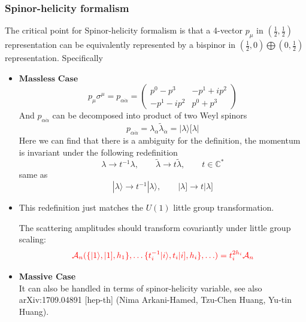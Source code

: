 \documentclass{beamer}
\newcommand{\aket}[1]{|#1\rangle}
\newcommand{\sket}[1]{|#1]}
\begin{document}
\begin{frame}
\frametitle{Spinor-helicity formalism}
    The critical point for Spinor-helicity formalism is that a 4-vector $p_\mu$ in $(\frac{1}{2},\frac{1}{2})$ representation can be equivalently represented by a bispinor in $(\frac{1}{2},0)\bigoplus (0,\frac{1}{2})$ representation.
    Specifically
    \begin{itemize}
        \item $\bm{\text{Massless Case}}$\\
    \begin{equation*}
        p_\mu \sigma^\mu=p_{\alpha\dot{\alpha}}=\begin{pmatrix*} 
            p^0-p^3 & -p^1+ip^2\\
            -p^1-ip^2 & p^0+p^3
        \end{pmatrix*}
    \end{equation*}
    And $p_{\alpha\dot{\alpha}}$ can be decomposed into product of two Weyl spinors
    \begin{equation*}
        p_{\alpha\dot{\alpha}}=\lambda_\alpha \tilde{\lambda}_{\dot{\alpha}}=\aket{\lambda}[\lambda|
    \end{equation*}
    Here we can find that there is a ambiguity for the definition, the momentum is invariant under the following redefinition
    \begin{equation*}
        \lambda \rightarrow t^{-1}\lambda, \qquad \tilde{\lambda}\rightarrow t\tilde{\lambda}, \qquad t\in\mathbb{C^*} 
    \end{equation*}
    same as 
    \begin{equation*}
        \aket{\lambda}\rightarrow t^{-1}\aket{\lambda}, \qquad \sket{\lambda}\rightarrow t\sket{\lambda}
    \end{equation*}
    \end{itemize}
\end{frame}

\begin{frame}
    \begin{itemize}
        \item[]  This redefinition just matches the $U(1)$ little group transformation.
        \vspace{0.5em}
        
        The scattering amplitudes should transform covariantly under little group scaling:
        \begin{equation*}
            \color{red} \mathcal{A}_n(\{\aket{1},\sket{1},h_1\},\ldots\{t_i^{-1}\aket{i},t_i\sket{i},h_i\},\ldots )=t_i^{2h_i}\mathcal{A}_n
        \end{equation*}
        \item \textbf{Massive Case}\\
        It can also be handled in terms of spinor-helicity variable, see also 	arXiv:1709.04891 [hep-th] (Nima Arkani-Hamed, Tzu-Chen Huang, Yu-tin Huang).
    \end{itemize}
\end{frame}
\end{document}
